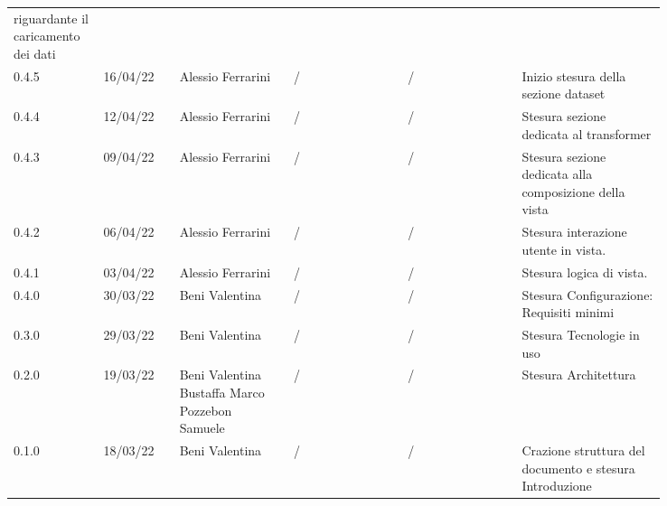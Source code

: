 {\begin{tabular}{p{0.10\linewidth}p{0.10\linewidth}p{0.15\linewidth}p{0.15\linewidth}p{0.15\linewidth}p{0.19\linewidth}}
  riguardante il caricamento dei dati \\
	\rowcolor[RGB]{216, 235, 171}
	0.4.5 & 16/04/22 & Alessio Ferrarini & / & / & Inizio stesura della sezione
  dataset \\
	\rowcolor[RGB]{233, 245, 206}
	0.4.4 & 12/04/22 & Alessio Ferrarini & / & / & Stesura sezione dedicata al
  transformer \\
	\rowcolor[RGB]{216, 235, 171}
	0.4.3 & 09/04/22 & Alessio Ferrarini & / & / & Stesura sezione dedicata alla
  composizione della vista \\
	\rowcolor[RGB]{233, 245, 206}
	0.4.2 & 06/04/22 & Alessio Ferrarini & / & / & Stesura interazione utente in
  vista. \\
	\rowcolor[RGB]{216, 235, 171}
	0.4.1 & 03/04/22 & Alessio Ferrarini & / & / & Stesura logica di vista. \\
	\rowcolor[RGB]{233, 245, 206}
	0.4.0 & 30/03/22 & Beni Valentina & / & / & Stesura Configurazione: Requisiti minimi\\
	\rowcolor[RGB]{216, 235, 171}
	0.3.0 & 29/03/22 & Beni Valentina & / & / & Stesura Tecnologie in uso\\
	\rowcolor[RGB]{233, 245, 206}
	0.2.0 & 19/03/22 & Beni Valentina Bustaffa Marco Pozzebon Samuele & / & / & Stesura Architettura\\
	\rowcolor[RGB]{216, 235, 171}
	0.1.0 & 18/03/22 & Beni Valentina & / & / & Crazione struttura del documento e stesura Introduzione\\
\end{tabular}
}
